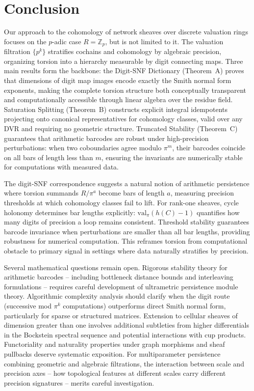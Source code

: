 \documentclass[11pt]{amsart}
\theoremstyle{plain}
\theoremstyle{definition}
\newcommand{\Zp}{\mathbb{Z}_p}                        %
\newcommand{\valpi}{\mathrm{val}_{\unif}}                   %
\newcommand{\Ring}{R}                          %
\newcommand{\unif}{\pi}                        %
\begin{document}
\section{Conclusion}
\label{sec:conclusion}

Our approach to the cohomology of network sheaves over discrete valuation rings focuses on the $p$-adic case $\Ring = \Zp$, but is not limited to it. The valuation filtration $\{p^k\}$ stratifies cochains and cohomology by algebraic precision, organizing torsion into a hierarchy measurable by digit connecting maps. Three main results form the backbone: the Digit-SNF Dictionary (Theorem~A) proves that dimensions of digit map images encode exactly the Smith normal form exponents, making the complete torsion structure both conceptually transparent and computationally accessible through linear algebra over the residue field. Saturation Splitting (Theorem~B) constructs explicit integral idempotents projecting onto canonical representatives for cohomology classes, valid over any DVR and requiring no geometric structure. Truncated Stability (Theorem~C) guarantees that arithmetic barcodes are robust under high-precision perturbations: when two coboundaries agree modulo $\unif^m$, their barcodes coincide on all bars of length less than $m$, ensuring the invariants are numerically stable for computations with measured data.

The digit-SNF correspondence suggests a natural notion of arithmetic persistence where torsion summands $\Ring/\unif^a$ become bars of length $a$, measuring precision thresholds at which cohomology classes fail to lift. For rank-one sheaves, cycle holonomy determines bar lengths explicitly: $\valpi(h(C)-1)$ quantifies how many digits of precision a loop remains consistent. Threshold stability guarantees barcode invariance when perturbations are smaller than all bar lengths, providing robustness for numerical computation. This reframes torsion from computational obstacle to primary signal in settings where data naturally stratifies by precision.

Several mathematical questions remain open. Rigorous stability theory for arithmetic barcodes -- including bottleneck distance bounds and interleaving formulations -- requires careful development of ultrametric persistence module theory. Algorithmic complexity analysis should clarify when the digit route (successive mod $\unif^k$ computations) outperforms direct Smith normal form, particularly for sparse or structured matrices. Extension to cellular sheaves of dimension greater than one involves additional subtleties from higher differentials in the Bockstein spectral sequence and potential interactions with cup products. Functoriality and naturality properties under graph morphisms and sheaf pullbacks deserve systematic exposition. For multiparameter persistence combining geometric and algebraic filtrations, the interaction between scale and precision axes -- how topological features at different scales carry different precision signatures -- merits careful investigation.
\end{document}
